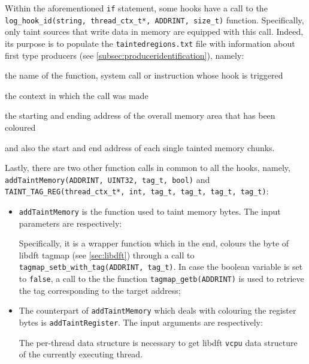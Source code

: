 \documentclass[LaM,binding=0.6cm]{sapthesis}
\begin{document}
Within the aforementioned \texttt{if} statement, some hooks have a call to the \texttt{log\_hoo\-k\_id(string, thread\_ctx\_t*, ADDRINT, size\_t)} function. Specifically, only taint sources that write data in memory are equipped with this call. Indeed, its purpose is to populate the \texttt{taintedregions.txt} file with information about first type producers (see \autoref{subsec:produceridentification}), namely:
\begin{enumerate*}[label=\roman*),itemjoin={,\quad}]
\item the name of the function, system call or instruction whose hook is triggered
\item the context in which the call was made
\item the starting and ending address of the overall memory area that has been coloured
\item and also the start and end address of each single tainted memory chunks.
\end{enumerate*}
Lastly, there are two other function calls in common to all the hooks, namely, \texttt{addTaintMemory(ADDRINT, UINT32, tag\_t, bool)} and \texttt{TAINT\_TAG\_REG(thread\_ctx\_t*, int, tag\_t, tag\_t, tag\_t, tag\_t)}:
\begin{itemize}
\item \texttt{addTaintMemory} is the function used to taint memory bytes. The input parameters are respectively: 
Specifically, it is a wrapper function which in the end, colours the byte of libdft tagmap (see \autoref{sec:libdft}) through a call to \texttt{tagmap\_setb\_with\_tag(ADDRINT, tag\_t)}. In case the boolean variable is set to \texttt{false}, a call to the the function \texttt{tagmap\_getb(ADDRINT)} is used to retrieve the tag corresponding to the target address;
\item The counterpart of \texttt{addTaintMemory} which deals with colouring the register bytes is \texttt{addTaintRegister}. The input arguments are respectively:
The per-thread data structure is necessary to get libdft \texttt{vcpu} data structure of the currently executing thread.
\end{itemize}
\end{document}

